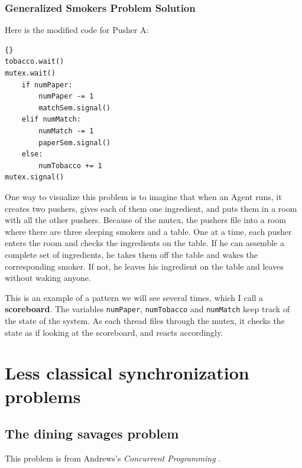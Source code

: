 \documentclass{book}
\newcommand{\clearemptydoublepage}{\newpage\cleardoublepage}
\begin{document}
\clearemptydoublepage
\subsection{Generalized Smokers Problem Solution}
\label{smoker}

Here is the modified code for Pusher A:

\begin{latin}
\begin{latin}
\begin{lstlisting}[title={Pusher A}]{}
tobacco.wait()
mutex.wait()
    if numPaper:
        numPaper -= 1
        matchSem.signal()
    elif numMatch:
        numMatch -= 1
        paperSem.signal()
    else: 
        numTobacco += 1
mutex.signal()
\end{lstlisting}
\end{latin}
\end{latin}

One way to visualize this problem is to imagine that when an
Agent runs, it creates two pushers, gives each of them one ingredient,
and puts them in a room with all the other pushers.  Because of the
mutex, the pushers file into a room where there are
three sleeping smokers and a table.  One at a time, each pusher enters
the room and checks the ingredients on the table.  If he can
assemble a complete set of ingredients, he takes them off the table
and wakes the corresponding smoker.  If not, he leaves his ingredient
on the table and leaves without waking anyone.

This is an example of a pattern we will see several times, which
I call a {\bf scoreboard}.  The variables {\tt numPaper}, {\tt numTobacco}
and {\tt numMatch} keep track of the state of the system.  As each
thread files through the mutex, it checks the state as if looking
at the scoreboard, and reacts accordingly.


\clearemptydoublepage
\chapter{Less classical synchronization problems}
\label{next}


\section{The dining savages problem}

This problem is from Andrews's 
{\em Concurrent Programming} \cite{andrews}.
\end{document}
